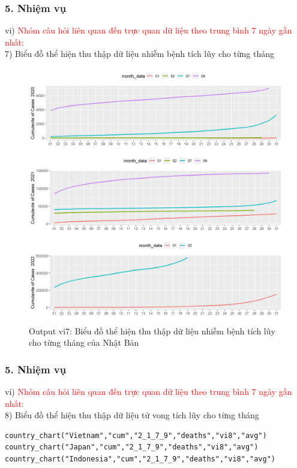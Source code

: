\documentclass[english,10pt,table]{beamer}
\begin{document}
\begin{frame}[fragile]
\frametitle{5.  Nhiệm vụ}
vi) \textcolor{red}{Nhóm câu hỏi liên quan đến trực quan dữ liệu theo trung bình 7 ngày gần nhất:}\\
    7) Biểu đồ thể hiện thu thập dữ liệu nhiễm bệnh tích lũy cho từng tháng
	\begin{figure}[h!]
	\begin{center}
		    \includegraphics[scale = 0.26]{Images/VI/vi7 Japan .jpeg}
		     \caption{Output vi7: Biểu đồ thể hiện thu thập dữ liệu nhiễm bệnh tích lũy cho từng tháng của Nhật Bản}
		\end{center}
		\end{figure}
\end{frame}

\begin{frame}[fragile]
\frametitle{5.  Nhiệm vụ}
vi) \textcolor{red}{Nhóm câu hỏi liên quan đến trực quan dữ liệu theo trung bình 7 ngày gần nhất:}\\
    8) Biểu đồ thể hiện thu thập dữ liệu tử vong tích lũy cho từng tháng
\begin{lstlisting}[frame = single,basicstyle=\tiny]
country_chart("Vietnam","cum","2_1_7_9","deaths","vi8","avg")
country_chart("Japan","cum","2_1_7_9","deaths","vi8","avg")
country_chart("Indonesia","cum","2_1_7_9","deaths","vi8","avg")
		\end{lstlisting}
\end{frame}
\end{document}
